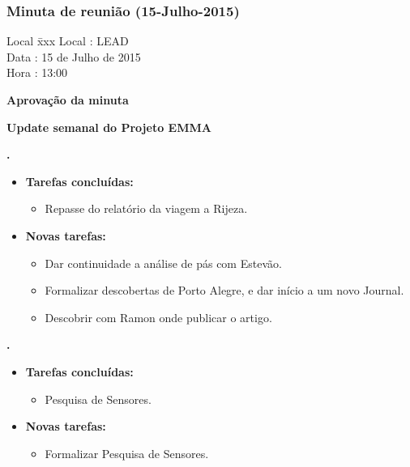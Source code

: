 \subsubsection{Minuta de reunião (15-Julho-2015)}

\begin{tabbing}
  Local \= xxx \kill
  Local \> : LEAD \\
  Data  \> : 15 de Julho de 2015 \\
  Hora  \> : 13:00
\end{tabbing}


\textbf{Aprovação da minuta}

\textbf{Update semanal do Projeto EMMA}

  
\textbf{\renan.} 
	\begin{itemize}
		\item \textbf{Tarefas concluídas:}
			\begin{itemize}    
				\item Repasse do relatório da viagem a Rijeza.
			\end{itemize}
		
		\item \textbf{Novas tarefas:}
			\begin{itemize} 
				\item Dar continuidade a análise de pás com Estevão.
				\item Formalizar descobertas de Porto Alegre, e dar início a um novo
				Journal.
				\item Descobrir com Ramon onde publicar o artigo.
			\end{itemize}
	\end{itemize}
		
\textbf{\elael.} 
	\begin{itemize}
		\item \textbf{Tarefas concluídas:}
			\begin{itemize}    
				\item Pesquisa de Sensores.
			\end{itemize}
		
		\item \textbf{Novas tarefas:}
			\begin{itemize} 
				\item Formalizar Pesquisa de Sensores.
			\end{itemize}
	\end{itemize}
					
